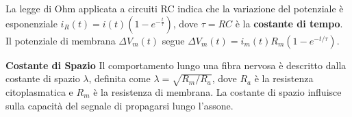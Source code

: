 {La legge di Ohm applicata a circuiti RC indica che la variazione del potenziale è esponenziale
\(i_R(t) = i(t) \left(1 - e^{-\frac{t}{\tau}}\right) \), dove \(\tau = RC\) è la \textbf{costante di tempo}. Il potenziale di membrana \(\Delta V_m(t)\) segue \(\Delta V_m(t) = i_m(t) R_m \left(1 - e^{-t/\tau}\right) \).

\textbf{Costante di Spazio} Il comportamento lungo una fibra nervosa è descritto dalla costante di spazio \(\lambda\), definita come \( \lambda = \sqrt{{R_m}/{R_a}} \), dove \(R_a\) è la resistenza citoplasmatica e \(R_m\) è la resistenza di membrana. La costante di spazio influisce sulla capacità del segnale di propagarsi lungo l'assone.
}

\newpage
\thispagestyle{empty}